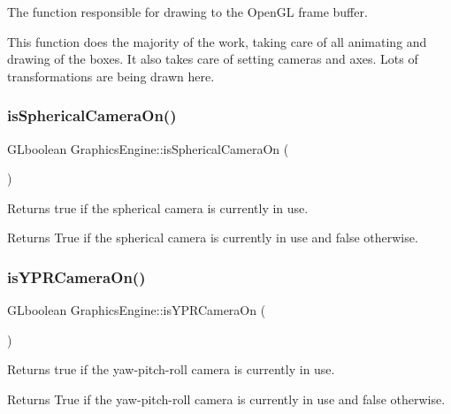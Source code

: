 The function responsible for drawing to the Open\+GL frame buffer. 

This function does the majority of the work, taking care of all animating and drawing of the boxes. It also takes care of setting cameras and axes. Lots of transformations are being drawn here. \mbox{\label{class_graphics_engine_a45375adf56d4769b0f33206dc760a1f6}} 
\subsubsection{\texorpdfstring{is\+Spherical\+Camera\+On()}{isSphericalCameraOn()}}
{\footnotesize\ttfamily G\+Lboolean Graphics\+Engine\+::is\+Spherical\+Camera\+On (\begin{DoxyParamCaption}{ }\end{DoxyParamCaption})}



Returns true if the spherical camera is currently in use. 

\begin{DoxyReturn}{Returns}
True if the spherical camera is currently in use and false otherwise. 
\end{DoxyReturn}
\mbox{\label{class_graphics_engine_a8ed6b779b8696620241ba701afd6de67}} 
\subsubsection{\texorpdfstring{is\+Y\+P\+R\+Camera\+On()}{isYPRCameraOn()}}
{\footnotesize\ttfamily G\+Lboolean Graphics\+Engine\+::is\+Y\+P\+R\+Camera\+On (\begin{DoxyParamCaption}{ }\end{DoxyParamCaption})}



Returns true if the yaw-\/pitch-\/roll camera is currently in use. 

\begin{DoxyReturn}{Returns}
True if the yaw-\/pitch-\/roll camera is currently in use and false otherwise. 
\end{DoxyReturn}
\mbox{\label{class_graphics_engine_a6a38e40ee4227a8b53dddf07f92323ee}} 
